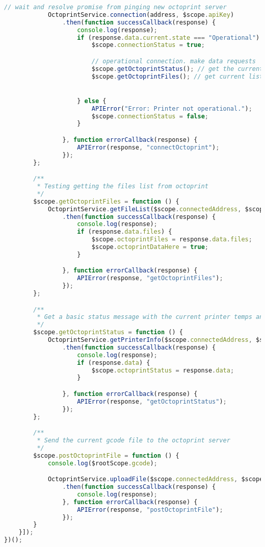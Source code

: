 \begin{lstlisting}[language=JavaScript, label={lst:octoprintController}, caption=The controller for the octoprint integration which was cut late in development.]
            // wait and resolve promise from pinging new octoprint server
            OctoprintService.connection(address, $scope.apiKey)
                .then(function successCallback(response) {
                    console.log(response);
                    if (response.data.current.state === "Operational") {
                        $scope.connectionStatus = true;

                        // operational connection. make data requests
                        $scope.getOctoprintStatus(); // get the current printer status
                        $scope.getOctoprintFiles(); // get current list of files


                    } else {
                        APIError("Error: Printer not operational.");
                        $scope.connectionStatus = false;
                    }

                }, function errorCallback(response) {
                    APIError(response, "connectOctoprint");
                });
        };

        /**
         * Testing getting the files list from octoprint
         */
        $scope.getOctoprintFiles = function () {
            OctoprintService.getFileList($scope.connectedAddress, $scope.apiKey)
                .then(function successCallback(response) {
                    console.log(response);
                    if (response.data.files) {
                        $scope.octoprintFiles = response.data.files;
                        $scope.octoprintDataHere = true;
                    }

                }, function errorCallback(response) {
                    APIError(response, "getOctoprintFiles");
                });
        };

        /**
         * Get a basic status message with the current printer temps and connection status
         */
        $scope.getOctoprintStatus = function () {
            OctoprintService.getPrinterInfo($scope.connectedAddress, $scope.apiKey)
                .then(function successCallback(response) {
                    console.log(response);
                    if (response.data) {
                        $scope.octoprintStatus = response.data;
                    }

                }, function errorCallback(response) {
                    APIError(response, "getOctoprintStatus");
                });
        };

        /**
         * Send the current gcode file to the octoprint server
         */
        $scope.postOctoprintFile = function () {
            console.log($rootScope.gcode);

            OctoprintService.uploadFile($scope.connectedAddress, $scope.apiKey, $rootScope.gcode)
                .then(function successCallback(response) {
                    console.log(response);
                }, function errorCallback(response) {
                    APIError(response, "postOctoprintFile");
                });
        }
    }]);
})();
\end{lstlisting}

